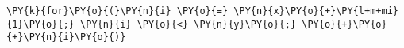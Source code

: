 \begin{Verbatim}[commandchars=\\\{\}]
\PY{k}{for}\PY{o}{(}\PY{n}{i} \PY{o}{=} \PY{n}{x}\PY{o}{+}\PY{l+m+mi}{1}\PY{o}{;} \PY{n}{i} \PY{o}{<} \PY{n}{y}\PY{o}{;} \PY{o}{+}\PY{o}{+}\PY{n}{i}\PY{o}{)}
\end{Verbatim}
